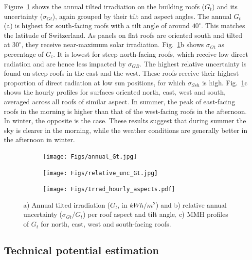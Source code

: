 Figure~\ref{fig:Gt} shows the annual tilted irradiation on the building roofs ($G_t$) and its uncertainty ($\sigma_{Gt}$), again grouped by their tilt and aspect angles. The annual $G_t$ (a) is highest for south-facing roofs with a tilt angle of around $40^\circ$. This matches the latitude of Switzerland. As panels on flat roofs are oriented south and tilted at $30^\circ$, they receive near-maximum solar irradiation.
Fig.~\ref{fig:Gt}b shows $\sigma_{Gt}$ as percentage of $G_t$. It is lowest for steep north-facing roofs, which receive low direct radiation and are hence less impacted by $\sigma_{GB}$. 
The highest relative uncertainty is found on steep roofs in the east and the west. 
These roofs receive their highest proportion of direct radiation at low sun positions, for which $\sigma_{Ssh}$ is high.
%
Fig.~\ref{fig:Gt}c shows the hourly profiles for surfaces oriented north, east, west and south, averaged across all roofs of similar aspect. In summer, the peak of east-facing roofs in the morning is higher than that of the west-facing roofs in the afternoon. In winter, the opposite is the case. 
These results suggest that during summer the sky is clearer in the morning, while the weather conditions are generally better in the afternoon in winter. 

\begin{figure}[tb]
\centering
\begin{subfigure}{.49\textwidth}
  \centering
  \texttt{[image: Figs/annual\_Gt.jpg]}  
  \subcaption{}
\end{subfigure}
\begin{subfigure}{.49\textwidth}
  \centering
  \texttt{[image: Figs/relative\_unc\_Gt.jpg]}  
  \subcaption{}
\end{subfigure}
\begin{subfigure}{.9\textwidth}
  \centering
  \texttt{[image: Figs/Irrad\_hourly\_aspects.pdf]} 
  \subcaption{}
\end{subfigure}
\caption{a) Annual tilted irradiation ($G_t$, in $kWh/m^2$) and b) relative annual uncertainty ($\sigma_{Gt} / G_t$) per roof aspect and tilt angle, c) MMH profiles of $G_t$ for north, east, west and south-facing roofs.}
\label{fig:Gt}
\end{figure}


\subsection{Technical potential estimation}
\label{tech}

